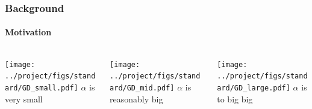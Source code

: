 \documentclass[10pt,aspectratio=169]{beamer}
\begin{document}
    \begin{frame}
        \frametitle{Background}
        \framesubtitle{Motivation}
        \begin{columns}
            \begin{column}{.3\textwidth}
                \texttt{[image: ../project/figs/standard/GD\_small.pdf]}
                $\alpha$ is very small
            \end{column}
            \begin{column}{.3\textwidth}
                \texttt{[image: ../project/figs/standard/GD\_mid.pdf]}
                $\alpha$ is reasonably big
            \end{column}%
            \begin{column}{.3\textwidth}
                \texttt{[image: ../project/figs/standard/GD\_large.pdf]}
                $\alpha$ is to big big
            \end{column}%
        \end{columns}
    \end{frame}
\end{document}
